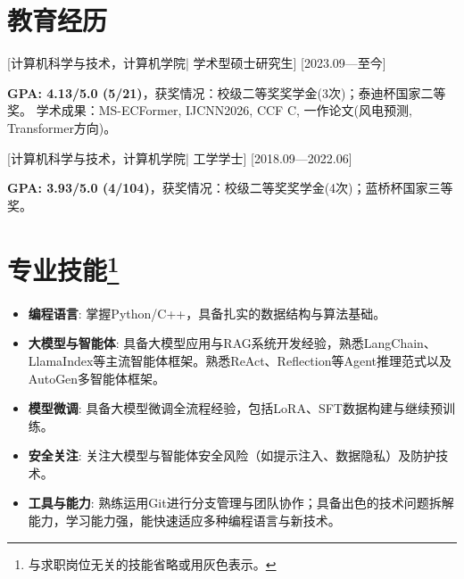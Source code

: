 \documentclass{resume}
\begin{document}


\ResumeTitle


\section{教育经历}
[\textnormal{计算机科学与技术，计算机学院|}  学术型硕士研究生]
[2023.09—至今]

\textbf{GPA: 4.13/5.0 (5/21)}，获奖情况：校级二等奖奖学金(3次)；泰迪杯国家二等奖。
学术成果：MS-ECFormer, IJCNN2026, CCF C, 一作论文(风电预测, Transformer方向)。

[\textnormal{计算机科学与技术，计算机学院|} 工学学士]
[2018.09—2022.06]

\textbf{GPA: 3.93/5.0 (4/104)}，获奖情况：校级二等奖奖学金(4次)；蓝桥杯国家三等奖。

\section[专业技能]{专业技能\protect\footnote{与求职岗位无关的技能省略或用灰色表示。}}
\begin{itemize}
  \item \textbf{编程语言}: 掌握Python/C++，具备扎实的数据结构与算法基础。
  \item \textbf{大模型与智能体}: 具备大模型应用与RAG系统开发经验，熟悉LangChain、LlamaIndex等主流智能体框架。熟悉ReAct、Reflection等Agent推理范式以及AutoGen多智能体框架。
  \item \textbf{模型微调}: 具备大模型微调全流程经验，包括LoRA、SFT数据构建与继续预训练。
  \item \textbf{安全关注}: 关注大模型与智能体安全风险（如提示注入、数据隐私）及防护技术。
  \item \textbf{工具与能力}: 熟练运用Git进行分支管理与团队协作；具备出色的技术问题拆解能力，学习能力强，能快速适应多种编程语言与新技术。
\end{itemize}
\end{document}
